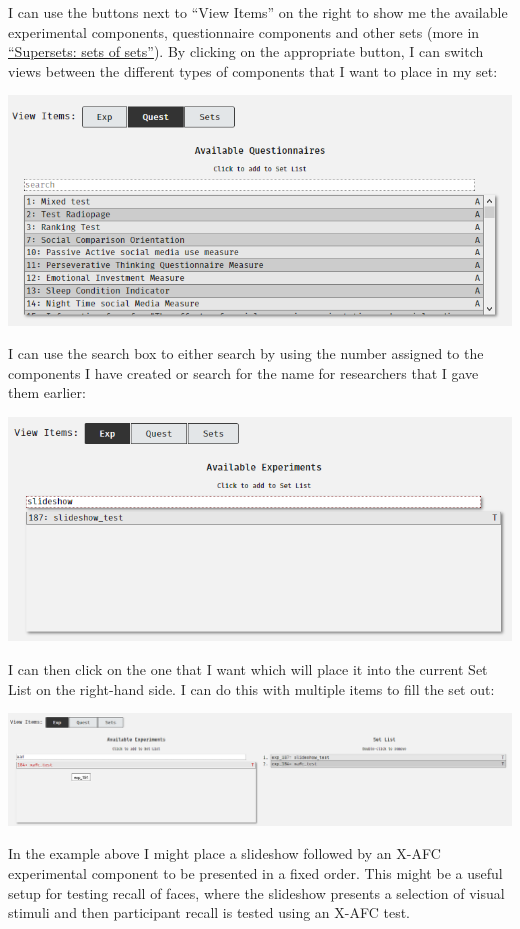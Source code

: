 \documentclass[]{book}
\begin{document}
I can use the buttons next to ``View Items'' on the right to show me the
available experimental components, questionnaire components and other
sets (more in \protect\hyperlink{supersets}{``Supersets: sets of
sets''}). By clicking on the appropriate button, I can switch views
between the different types of components that I want to place in my
set:

\includegraphics{images/screenshots/sets_5.png}

I can use the search box to either search by using the number assigned
to the components I have created or search for the name for researchers
that I gave them earlier:

\includegraphics{images/screenshots/sets_6.png}

I can then click on the one that I want which will place it into the
current Set List on the right-hand side. I can do this with multiple
items to fill the set out:

\includegraphics{images/screenshots/sets_7.png}

In the example above I might place a slideshow followed by an X-AFC
experimental component to be presented in a fixed order. This might be a
useful setup for testing recall of faces, where the slideshow presents a
selection of visual stimuli and then participant recall is tested using
an X-AFC test.
\end{document}

